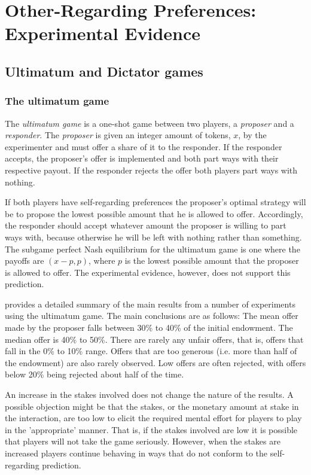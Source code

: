 \documentclass[12pt]{article}
\begin{document}
\section{Other-Regarding Preferences: Experimental Evidence}
\subsection{Ultimatum and Dictator games}
\subsubsection{The ultimatum game}
The \textit{ultimatum game} is a one-shot game between two players, a \textit{proposer} and a \textit{responder}. The \textit{proposer} is given an integer amount of tokens, $x$, by the experimenter and must offer a share of it to the responder. If the responder accepts, the proposer's offer is implemented and both part ways with their respective payout. If the responder rejects the offer both players part ways with nothing.

If both players have self-regarding preferences the proposer's optimal strategy will be to propose the lowest possible amount that he is allowed to offer. Accordingly, the responder should accept whatever amount the proposer is willing to part ways with, because otherwise he will be left with nothing rather than something. The subgame perfect Nash equilibrium for the ultimatum game is one where the payoffs are $\left(x-p,p \right)$, where $p$ is the lowest possible amount that the proposer is allowed to offer. The experimental evidence, however, does not support this prediction. 

\cite{camerer2011behavioral} provides a detailed summary of the main results from a number of experiments using the ultimatum game. The main conclusions are as follows: The mean offer  made by the proposer falls between 30\% to 40\% of the initial endowment. The median offer is 40\% to 50\%. There are rarely any unfair offers, that is, offers that fall in the 0\% to 10\% range. Offers that are too generous (i.e. more than half of the endowment) are also rarely observed. Low offers are often rejected, with offers below 20\% being rejected about half of the time. 

An increase in the stakes involved does not change the nature of the results. A possible objection might be that the stakes, or the monetary amount at stake in the interaction, are too low to elicit the required mental effort for players to play in the 'appropriate' manner. That is, if the stakes involved are low it is possible that players will not take the game seriously. However, when the stakes are increased players continue behaving in ways that do not conform to the self-regarding prediction.
\end{document}
